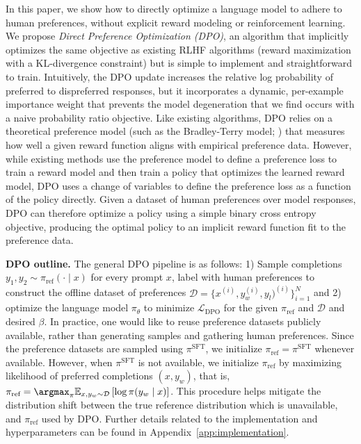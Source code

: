 In this paper, we show how to directly optimize a language model to adhere to human preferences, without explicit reward modeling or reinforcement learning. We propose
\textit{{Direct Preference Optimization} (DPO)}, an algorithm that implicitly optimizes the same objective as existing RLHF algorithms (reward maximization with a KL-divergence constraint) but is simple to implement and straightforward to train. Intuitively, the DPO update increases the relative log probability of preferred to dispreferred responses, but it incorporates a dynamic, per-example importance weight that prevents the model degeneration that we find occurs with a naive probability ratio objective. Like existing algorithms, DPO relies on a theoretical preference model (such as the Bradley-Terry model; \cite{bradley1952rankanalysis}) that measures how well a given reward function aligns with empirical preference data. However, while existing methods use the preference model to define a preference loss to train a reward model and then train a policy that optimizes the learned reward model, DPO uses a change of variables to define the preference loss as a function of the policy directly. Given a dataset of human preferences over model responses, DPO can therefore optimize a policy using a simple binary cross entropy objective, producing the optimal policy to an implicit reward function fit to the preference data.

\textbf{DPO outline.} The general DPO pipeline is as follows: 1) Sample completions $y_1, y_2 \sim \pi_\text{ref}(\cdot \mid x)$ for every prompt $x$, label with human preferences to construct the offline dataset of preferences $\mathcal{D} = \{x^{(i)}, y_w^{(i)}, y_l)^{(i)}\}_{i=1}^N$ and 2) optimize the language model $\pi_\theta$ to minimize $\mathcal{L}_\text{DPO}$ for the given $\pi_\text{ref}$ and $\mathcal{D}$ and desired $\beta$. 
In practice, one would like to reuse preference datasets publicly available, rather than generating samples and gathering human preferences. Since the preference datasets are sampled using $\pi^\text{SFT}$, we initialize $\pi_\text{ref} = \pi^\text{SFT}$ whenever available. However, when $\pi^\text{SFT}$ is not available, we initialize $\pi_\text{ref}$ by maximizing likelihood of preferred completions ${(x, y_w)}$, that is, ${\pi_\text{ref} = \argmax_{\pi}\mathbb{E}_{x, y_w \sim \mathcal{D}}\left[\log \pi(y_w \mid x)\right]}$. This procedure helps mitigate the distribution shift between the true reference distribution which is unavailable, and $\pi_\text{ref}$ used by DPO. Further details related to the implementation and hyperparameters can be found in Appendix~\ref{app:implementation}.

